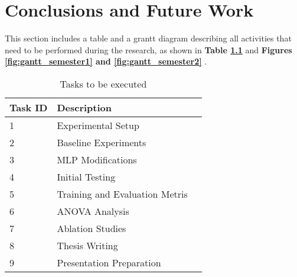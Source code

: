 \chapter{Conclusions and Future Work}

\label{chapter:schedule}

This section includes a table and a grantt diagram describing all activities that need to be performed during the research, as shown in \textbf{Table \ref{tab:tasks}} and \textbf{Figures \ref{fig:gantt_semester1} and \ref{fig:gantt_semester2} }.

\begin{table}
	\centering
	\renewcommand{\arraystretch}{1.3}
	\caption{Tasks to be executed}
	\label{tab:tasks}
	\begin{tabular}{lll}
\cline{1-2}
\textbf{Task ID} & \textbf{Description}           &  \\ \hline
1                & Experimental Setup             &  \\
2                & Baseline Experiments           &  \\
3                & MLP Modifications              &  \\
4                & Initial Testing                &  \\
5                & Training and Evaluation Metris &  \\
6                & ANOVA Analysis                 &  \\
7                & Ablation Studies               &  \\
8                & Thesis Writing                 &  \\
9                & Presentation Preparation       & 
\end{tabular}
\end{table}

\newpage


